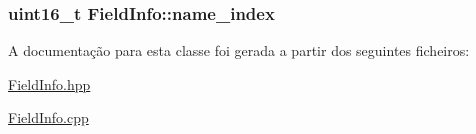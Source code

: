 \subsubsection[{\texorpdfstring{name\+\_\+index}{name_index}}]{\setlength{\rightskip}{0pt plus 5cm}uint16\+\_\+t Field\+Info\+::name\+\_\+index}\hypertarget{class_field_info_a97fd269599826fe99f61ae83311a909c}{}\label{class_field_info_a97fd269599826fe99f61ae83311a909c}


A documentação para esta classe foi gerada a partir dos seguintes ficheiros\+:\begin{DoxyCompactItemize}
\item 
\hyperlink{_field_info_8hpp}{Field\+Info.\+hpp}\item 
\hyperlink{_field_info_8cpp}{Field\+Info.\+cpp}\end{DoxyCompactItemize}
